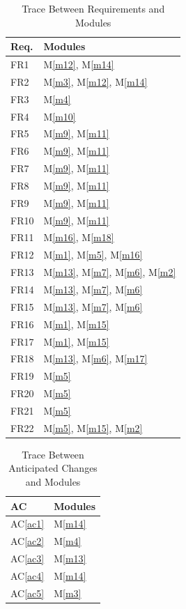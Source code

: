 \documentclass[12pt, titlepage]{article}
\newcommand{\acref}[1]{AC\ref{#1}}
\newcommand{\mref}[1]{M\ref{#1}}
\begin{document}
	\begin{table}[H]
		\centering
		\begin{tabular}{p{} p{}}
			\toprule
			\textbf{Req.} & \textbf{Modules}\\
			\midrule
			FR1 & \mref{m12}, \mref{m14}\\
			FR2 & \mref{m3}, \mref{m12}, \mref{m14}\\
			FR3 & \mref{m4}\\
			FR4 & \mref{m10}\\
			FR5 & \mref{m9}, \mref{m11}\\
			FR6 & \mref{m9}, \mref{m11}\\
			FR7 & \mref{m9}, \mref{m11}\\
			FR8 & \mref{m9}, \mref{m11}\\
			FR9 & \mref{m9}, \mref{m11}\\
			FR10 & \mref{m9}, \mref{m11}\\
			FR11 & \mref{m16}, \mref{m18}\\
			FR12 & \mref{m1}, \mref{m5}, \mref{m16}\\
			FR13 & \mref{m13}, \mref{m7}, \mref{m6}, \mref{m2}\\
			FR14 & \mref{m13}, \mref{m7}, \mref{m6}\\
			FR15 & \mref{m13}, \mref{m7}, \mref{m6}\\
			FR16 & \mref{m1}, \mref{m15}\\
			FR17 & \mref{m1}, \mref{m15}\\
			FR18 & \mref{m13}, \mref{m6}, \mref{m17}\\
			FR19 & \mref{m5}\\
			FR20 & \mref{m5}\\
			FR21 & \mref{m5}\\
			FR22 & \mref{m5}, \mref{m15}, \mref{m2}\\
			
			\bottomrule
		\end{tabular}
		\caption{Trace Between Requirements and Modules}
		\label{TblRT}
	\end{table}
	
	\begin{table}[H]
		\centering
		\begin{tabular}{p{} p{}}
			\toprule
			\textbf{AC} & \textbf{Modules}\\
			\midrule
			\acref{ac1} & \mref{m14}\\
			\acref{ac2} & \mref{m4}\\
			\acref{ac3} & \mref{m13}\\
			\acref{ac4} & \mref{m14}\\
			\acref{ac5} & \mref{m3}\\
			\bottomrule
		\end{tabular}
		\caption{Trace Between Anticipated Changes and Modules}
		\label{TblACT}
	\end{table}
	
\end{document}
